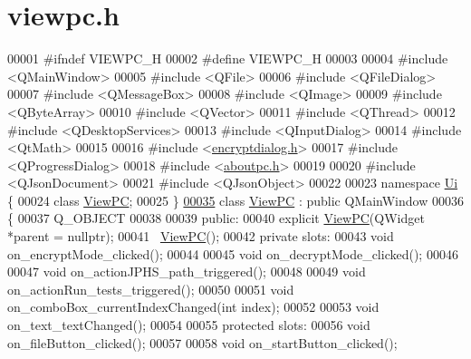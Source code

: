 \hypertarget{viewpc_8h_source}{}\section{viewpc.\+h}

\begin{DoxyCode}
00001 \textcolor{preprocessor}{#ifndef VIEWPC\_H}
00002 \textcolor{preprocessor}{#define VIEWPC\_H}
00003 
00004 \textcolor{preprocessor}{#include <QMainWindow>}
00005 \textcolor{preprocessor}{#include <QFile>}
00006 \textcolor{preprocessor}{#include <QFileDialog>}
00007 \textcolor{preprocessor}{#include <QMessageBox>}
00008 \textcolor{preprocessor}{#include <QImage>}
00009 \textcolor{preprocessor}{#include <QByteArray>}
00010 \textcolor{preprocessor}{#include <QVector>}
00011 \textcolor{preprocessor}{#include <QThread>}
00012 \textcolor{preprocessor}{#include <QDesktopServices>}
00013 \textcolor{preprocessor}{#include <QInputDialog>}
00014 \textcolor{preprocessor}{#include <QtMath>}
00015 
00016 \textcolor{preprocessor}{#include <\hyperlink{encryptdialog_8h}{encryptdialog.h}>}
00017 \textcolor{preprocessor}{#include <QProgressDialog>}
00018 \textcolor{preprocessor}{#include <\hyperlink{aboutpc_8h}{aboutpc.h}>}
00019 
00020 \textcolor{preprocessor}{#include <QJsonDocument>}
00021 \textcolor{preprocessor}{#include <QJsonObject>}
00022 
00023 \textcolor{keyword}{namespace }\hyperlink{namespace_ui}{Ui} \{
00024 \textcolor{keyword}{class }\hyperlink{class_view_p_c}{ViewPC};
00025 \}
\hypertarget{viewpc_8h_source.tex_l00035}{}\hyperlink{class_view_p_c}{00035} \textcolor{keyword}{class }\hyperlink{class_view_p_c}{ViewPC} : \textcolor{keyword}{public} QMainWindow
00036 \{
00037     Q\_OBJECT
00038 
00039 \textcolor{keyword}{public}:
00040     \textcolor{keyword}{explicit} \hyperlink{class_view_p_c}{ViewPC}(QWidget *parent = \textcolor{keyword}{nullptr});
00041     ~\hyperlink{class_view_p_c}{ViewPC}();
00042 \textcolor{keyword}{private} slots:
00043     \textcolor{keywordtype}{void} on\_encryptMode\_clicked();
00044 
00045     \textcolor{keywordtype}{void} on\_decryptMode\_clicked();
00046 
00047     \textcolor{keywordtype}{void} on\_actionJPHS\_path\_triggered();
00048 
00049     \textcolor{keywordtype}{void} on\_actionRun\_tests\_triggered();
00050 
00051     \textcolor{keywordtype}{void} on\_comboBox\_currentIndexChanged(\textcolor{keywordtype}{int} index);
00052 
00053     \textcolor{keywordtype}{void} on\_text\_textChanged();
00054 
00055 \textcolor{keyword}{protected} slots:
00056     \textcolor{keywordtype}{void} on\_fileButton\_clicked();
00057 
00058     \textcolor{keywordtype}{void} on\_startButton\_clicked();

\end{DoxyCode}
